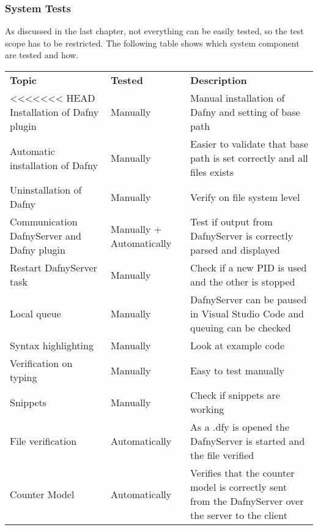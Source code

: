 \subsubsection{System Tests}
As discussed in the last chapter, not everything can be easily tested, so the test scope has to be restricted. The following table shows which system component are tested and how.
\begin{longtable}{ p{} | p{} | p{} }
\rowcolor{gray!50}
	\textbf{Topic} & \textbf{Tested} & \textbf{Description}\\
<<<<<<< HEAD
	Installation of Dafny plugin & Manually & Manual installation of Dafny and setting of base path   \\
	Automatic installation of Dafny & Manually & Easier to validate that base path is set correctly and all files exists \\
	Uninstallation of Dafny & Manually & Verify on file system level\\
	Communication DafnyServer and Dafny plugin & Manually + Automatically & Test if output from DafnyServer is correctly parsed and displayed\\
	Restart DafnyServer task & Manually & Check if a new PID is used and the other is stopped\\
	Local queue & Manually & DafnyServer can be paused in Visual Studio Code and queuing can be checked \\
	Syntax highlighting & Manually & Look at example code \\
	Verification on typing & Manually & Easy to test manually\\
	Snippets & Manually & Check if snippets are working\\
	File verification & Automatically & As a .dfy is opened the DafnyServer is started and the file verified \\
	Counter Model & Automatically & Verifies that the counter model is correctly sent from the DafnyServer over the server to the client \\


\end{longtable}
